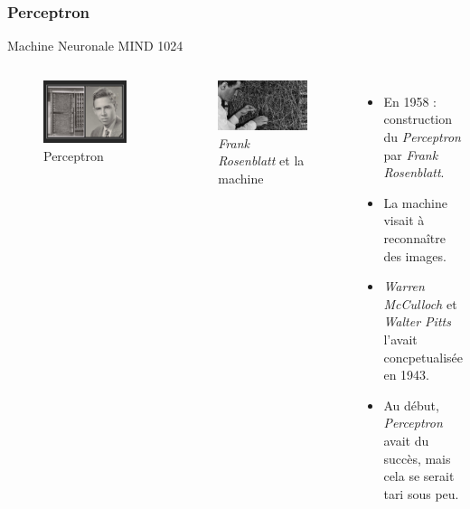 \documentclass{beamer}
\begin{document}
\subsubsection{Perceptron}

\begin{frame}{Machine Neuronale MIND 1024}
    \begin{columns}[T]
            \begin{figure}
                \centering
                \includegraphics[width=0.65\linewidth]{pic/perceptron2.jpeg}
                \caption{Perceptron}
            \end{figure}
            \begin{figure}
                \centering
                \includegraphics[width=0.6\linewidth]{pic/perceptron.jpeg}
                \caption{\textit{Frank Rosenblatt} et la machine}
            \end{figure}
            \begin{itemize}[<+-| alert@+>] %
                \item En 1958 : construction du \textit{Perceptron} par \textit{Frank Rosenblatt}.
                \item La machine visait à reconnaître des images.
                \item \textit{Warren McCulloch} et \textit{Walter Pitts} l'avait concpetualisée en 1943.
                \item Au début, \textit{Perceptron} avait du succès, mais cela se serait tari sous peu.
            \end{itemize}
    \end{columns}
\end{frame}
\end{document}
